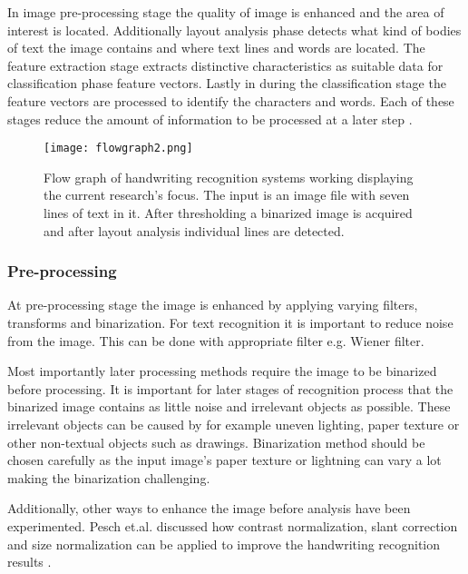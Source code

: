 \documentclass{article}
\begin{document}
    In image pre-processing stage the quality of image is enhanced and the area of interest is located. Additionally layout analysis phase detects what kind of bodies of text the image contains and where text lines and words are located. The feature extraction stage extracts distinctive characteristics as suitable data for classification phase feature vectors. Lastly in during the classification stage the feature vectors are processed to identify the characters and words. Each of these stages reduce the amount of information to be processed at a later step \cite{Cheriet2007}.

    \begin{figure}[!ht]
      \centering
      \texttt{[image: flowgraph2.png]}
      \caption{Flow graph of handwriting recognition systems working displaying the current research's focus. The input is an image file with seven lines of text in it. After thresholding a binarized image is acquired and after layout analysis individual lines are detected.  \label{fig:flow} }
    \end{figure}

      \subsubsection{Pre-processing}
        At pre-processing stage the image is enhanced by applying varying filters, transforms and binarization. For text recognition it is important to reduce noise from the image. This can be done with appropriate filter e.g. Wiener filter.

        Most  importantly later processing methods require the image to be binarized before processing. It is important for later stages of recognition process that the binarized image contains as little noise and irrelevant objects as possible.  These irrelevant objects can be caused by for example uneven lighting, paper texture or other non-textual objects such as drawings. Binarization method should be chosen carefully as the input image's paper texture or lightning can vary a lot making the binarization challenging.

        Additionally, other ways to enhance the image before analysis have been experimented. Pesch et.al. discussed how contrast normalization, slant correction and size normalization can be applied to improve the handwriting recognition results \cite{Pesch2012}.
\end{document}
